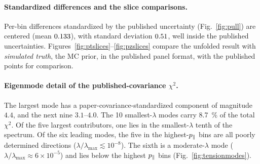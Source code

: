 \paragraph{Standardized differences and the slice comparisons.} Per-bin differences standardized by the published uncertainty (Fig.~\ref{fig:pull}) are centered (mean $0.133$), with standard deviation $0.51$, well inside the published uncertainties. Figures~\ref{fig:ptslices}--\ref{fig:pzslices} compare the unfolded result with \emph{simulated truth}, the MC prior, in the published panel format, with the published points for comparison.

\paragraph{Eigenmode detail of the published-covariance $\chi^{2}$.} The largest mode has a paper-covariance-standardized component of magnitude $4.4$, and the next nine $3.1$--$4.0$. The 10 smallest-$\lambda$ modes carry \SI{8.7}{\percent} of the total $\chi^{2}$. Of the five largest contributors, one lies in the smallest-$\lambda$ tenth of the spectrum. Of the six leading modes, the five in the highest-$p_{\parallel}$ bins are all poorly determined directions ($\lambda/\lambda_{\max}\lesssim10^{-8}$). The sixth is a moderate-$\lambda$ mode ($\lambda/\lambda_{\max}\approx6\times10^{-5}$) and lies below the highest $p_{\parallel}$ bins (Fig.~\ref{fig:tensionmodes}).

